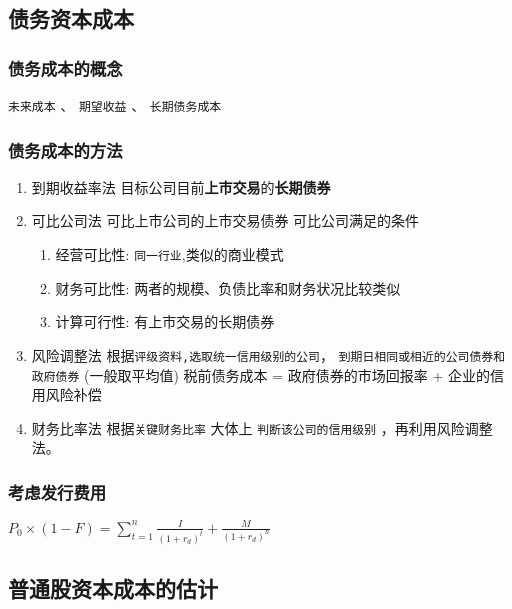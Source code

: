 \documentclass[11pt]{article}
\begin{document}
\subsection{债务资本成本}
\label{sec:org2631be3}
\subsubsection{债务成本的概念}
\label{sec:orgfeb171f}
\texttt{未来成本} 、 \texttt{期望收益} 、 \texttt{长期债务成本}
\subsubsection{债务成本的方法}
\label{sec:org0d29ea7}
\begin{enumerate}
\item 到期收益率法
目标公司目前\textbf{上市交易}的\textbf{长期债券}
\item 可比公司法
可比上市公司的上市交易债券
可比公司满足的条件
\begin{enumerate}
\item 经营可比性: \texttt{同一行业},类似的商业模式
\item 财务可比性: 两者的规模、负债比率和财务状况比较类似
\item 计算可行性: 有上市交易的长期债券
\end{enumerate}
\item 风险调整法
根据\texttt{评级资料,选取统一信用级别的公司}， \texttt{到期日相同或相近的公司债券和政府债券} (一般取平均值)
税前债务成本 = 政府债券的市场回报率 + 企业的信用风险补偿
\item 财务比率法
根据\texttt{关键财务比率} 大体上 \texttt{判断该公司的信用级别} ，再利用风险调整法。
\end{enumerate}
\subsubsection{考虑发行费用}
\label{sec:org9da97f4}
\(P_{0}\times (1-F)=\sum\limits_{t=1}^{n}\frac{I}{(1+r_{d})^{t}}+\frac{M}{(1+r_{d})^{n}}\)
\subsection{普通股资本成本的估计}
\label{sec:orga470963}
\end{document}
